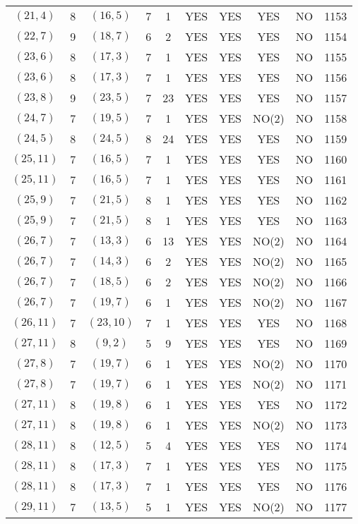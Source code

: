 \begin{longtable}{|c|c|c|c|c|c|c|c|c|c|}
$(21, 4)$ & 8 & $(16, 5)$ & 7 & 1 & YES & YES & YES & NO & 1153\\
$(22, 7)$ & 9 & $(18, 7)$ & 6 & 2 & YES & YES & YES & NO & 1154\\
$(23, 6)$ & 8 & $(17, 3)$ & 7 & 1 & YES & YES & YES & NO & 1155\\
$(23, 6)$ & 8 & $(17, 3)$ & 7 & 1 & YES & YES & YES & NO & 1156\\
$(23, 8)$ & 9 & $(23, 5)$ & 7 & 23 & YES & YES & YES & NO & 1157\\
$(24, 7)$ & 7 & $(19, 5)$ & 7 & 1 & YES & YES & NO(2) & NO & 1158\\
$(24, 5)$ & 8 & $(24, 5)$ & 8 & 24 & YES & YES & YES & NO & 1159\\
$(25, 11)$ & 7 & $(16, 5)$ & 7 & 1 & YES & YES & YES & NO & 1160\\
$(25, 11)$ & 7 & $(16, 5)$ & 7 & 1 & YES & YES & YES & NO & 1161\\
$(25, 9)$ & 7 & $(21, 5)$ & 8 & 1 & YES & YES & YES & NO & 1162\\
$(25, 9)$ & 7 & $(21, 5)$ & 8 & 1 & YES & YES & YES & NO & 1163\\
$(26, 7)$ & 7 & $(13, 3)$ & 6 & 13 & YES & YES & NO(2) & NO & 1164\\
$(26, 7)$ & 7 & $(14, 3)$ & 6 & 2 & YES & YES & NO(2) & NO & 1165\\
$(26, 7)$ & 7 & $(18, 5)$ & 6 & 2 & YES & YES & NO(2) & NO & 1166\\
$(26, 7)$ & 7 & $(19, 7)$ & 6 & 1 & YES & YES & NO(2) & NO & 1167\\
$(26, 11)$ & 7 & $(23, 10)$ & 7 & 1 & YES & YES & YES & NO & 1168\\
$(27, 11)$ & 8 & $(9, 2)$ & 5 & 9 & YES & YES & YES & NO & 1169\\
$(27, 8)$ & 7 & $(19, 7)$ & 6 & 1 & YES & YES & NO(2) & NO & 1170\\
$(27, 8)$ & 7 & $(19, 7)$ & 6 & 1 & YES & YES & NO(2) & NO & 1171\\
$(27, 11)$ & 8 & $(19, 8)$ & 6 & 1 & YES & YES & YES & NO & 1172\\
$(27, 11)$ & 8 & $(19, 8)$ & 6 & 1 & YES & YES & NO(2) & NO & 1173\\
$(28, 11)$ & 8 & $(12, 5)$ & 5 & 4 & YES & YES & YES & NO & 1174\\
$(28, 11)$ & 8 & $(17, 3)$ & 7 & 1 & YES & YES & YES & NO & 1175\\
$(28, 11)$ & 8 & $(17, 3)$ & 7 & 1 & YES & YES & YES & NO & 1176\\
$(29, 11)$ & 7 & $(13, 5)$ & 5 & 1 & YES & YES & NO(2) & NO & 1177\\

\end{longtable}
